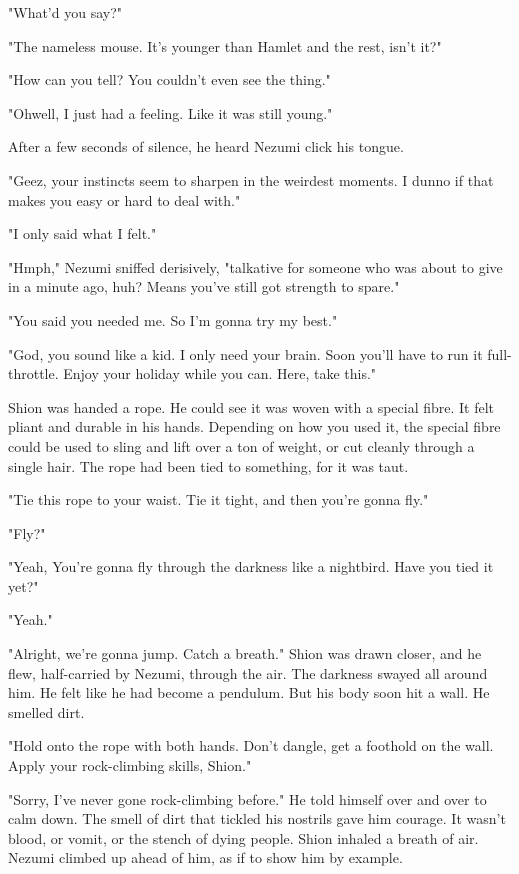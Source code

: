 "What'd you say?"

"The nameless mouse. It's younger than Hamlet and the rest, isn't it?"

"How can you tell? You couldn't even see the thing."

"Oh\el well, I just had a feeling. Like it was still young."

After a few seconds of silence, he heard Nezumi click his tongue.

"Geez, your instincts seem to sharpen in the weirdest moments. I dunno
if that makes you easy or hard to deal with."

"I only said what I felt."

"Hmph," Nezumi sniffed derisively, "talkative for someone who was about
to give in a minute ago, huh? Means you've still got strength to spare."

"You said you needed me. So I'm gonna try my best."

"God, you sound like a kid. I only need your brain. Soon you'll have to
run it full-throttle. Enjoy your holiday while you can. Here, take
this."

Shion was handed a rope. He could see it was woven with a special fibre.
It felt pliant and durable in his hands. Depending on how you used it,
the special fibre could be used to sling and lift over a ton of weight,
or cut cleanly through a single hair. The rope had been tied to
something, for it was taut.

"Tie this rope to your waist. Tie it tight, and then you're gonna fly."

"Fly?"

"Yeah, You're gonna fly through the darkness like a nightbird. Have you
tied it yet?"

"Yeah."

"Alright, we're gonna jump. Catch a breath." Shion was drawn closer, and
he flew, half-carried by Nezumi, through the air. The darkness swayed
all around him. He felt like he had become a pendulum. But his body soon
hit a wall. He smelled dirt.

"Hold onto the rope with both hands. Don't dangle, get a foothold on the
wall. Apply your rock-climbing skills, Shion."

"Sorry, I've never gone rock-climbing before." He told himself over and
over to calm down. The smell of dirt that tickled his nostrils gave him
courage. It wasn't blood, or vomit, or the stench of dying people. Shion
inhaled a breath of air. Nezumi climbed up ahead of him, as if to show
him by example.

